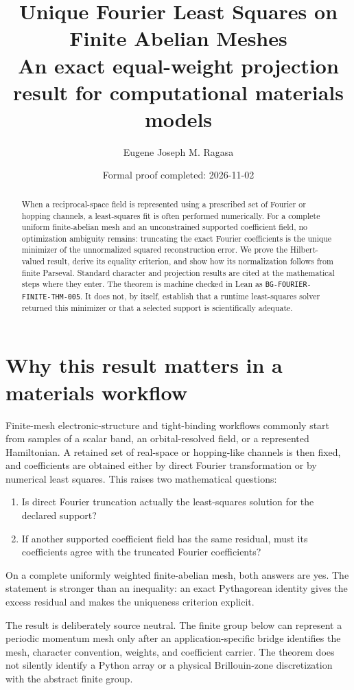 \documentclass[11pt]{article}
\title{Unique Fourier Least Squares on Finite Abelian Meshes\\
\large An exact equal-weight projection result for computational materials models}
\author{Eugene Joseph M. Ragasa}
\date{Formal proof completed: 2026-11-02}
\begin{document}
\maketitle

\begin{abstract}
When a reciprocal-space field is represented using a prescribed set of Fourier or hopping
channels, a least-squares fit is often performed numerically.  For a complete uniform
finite-abelian mesh and an unconstrained supported coefficient field, no optimization ambiguity
remains: truncating the exact Fourier coefficients is the unique minimizer of the unnormalized
squared reconstruction error.  We prove the Hilbert-valued result, derive its equality criterion,
and show how its normalization follows from finite Parseval.  Standard character and projection
results are cited at the mathematical steps where they enter.  The theorem is machine checked in
Lean as \texttt{BG-FOURIER-FINITE-THM-005}.  It does not, by itself, establish that a runtime
least-squares solver returned this minimizer or that a selected support is scientifically adequate.
\end{abstract}

\section{Why this result matters in a materials workflow}
Finite-mesh electronic-structure and tight-binding workflows commonly start from samples of a
scalar band, an orbital-resolved field, or a represented Hamiltonian.  A retained set of
real-space or hopping-like channels is then fixed, and coefficients are obtained either by direct
Fourier transformation or by numerical least squares.  This raises two mathematical questions:
\begin{enumerate}
  \item Is direct Fourier truncation actually the least-squares solution for the declared support?
  \item If another supported coefficient field has the same residual, must its coefficients agree
        with the truncated Fourier coefficients?
\end{enumerate}
On a complete uniformly weighted finite-abelian mesh, both answers are yes.  The statement is
stronger than an inequality: an exact Pythagorean identity gives the excess residual and makes the
uniqueness criterion explicit.

The result is deliberately source neutral.  The finite group below can represent a periodic
momentum mesh only after an application-specific bridge identifies the mesh, character convention,
weights, and coefficient carrier.  The theorem does not silently identify a Python array or a
physical Brillouin-zone discretization with the abstract finite group.
\end{document}
